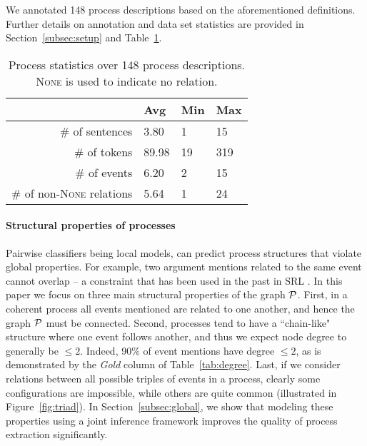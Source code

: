 We annotated 148 process descriptions based on the aforementioned definitions. Further details on annotation and data set statistics are provided in Section~\ref{subsec:setup} and Table~\ref{tab:datastats}.

\begin{table}[t]
{\small
\hfill{}
\begin{tabular}{ r | l | l | l }
&\textbf{Avg}&\textbf{Min} & \textbf{Max}\\
\hline
\# of sentences            &     3.80       &    1        &   15 \\ 
\# of tokens            &     89.98        &   19        & 319  \\ 
\# of events                &   6.20         &       2   &  15  \\ 
\# of non-\textsc{None} relations          &     5.64       &      1        &  24 \\ 
\end{tabular}}
\hfill{}
\caption{Process statistics over 148 process descriptions. \textsc{None} is used to indicate no relation.}
\label{tab:datastats}
\end{table}

\paragraph{Structural properties of processes} 
Pairwise classifiers being local models, can predict process structures that violate global properties. For example, two argument mentions related to the same event cannot overlap -- a constraint that has been used in the past in SRL \cite{Toutanova08}. In this paper we focus on three main structural properties of the graph $\mathcal{P}$. First, in a coherent process all events mentioned are related to one another, and hence the graph $\mathcal{P}$ must be connected. Second, processes tend to have a ``chain-like" structure where one event follows another, and thus we expect node degree to generally be $\leq 2$. Indeed, 90\% of event mentions have degree $\leq2$, as is demonstrated by the \emph{Gold} column of Table~\ref{tab:degree}. Last, if we consider relations between all possible triples of events in a process, clearly some configurations are impossible, while others are quite common (illustrated in Figure~\ref{fig:triad}). In Section~\ref{subsec:global}, we show that modeling these properties using a joint inference framework improves the quality of process extraction significantly.

